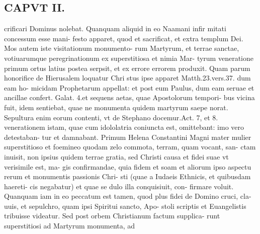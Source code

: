 \documentclass{article}
\begin{document}
\begin{pages}
\section*{CAPVT  II. }
\marginpar{[ p.69 ]}\pstart crificari Dominus nolebat. Quanquam aliquid in eo Naamani infir mitati concessum esse mani- festo apparet, quod et sacrificat, et extra templum Dei. Mos autem iste visitationum monumento- rum Martyrum, et terrae sanctae, votiuarumque peregrinationum ex superstitiosa et nimia Mar- tyrum veneratione primum ortus latius postea serpsit, et ex errore errorem produxit. Quam parum honorifice de Hierusalem loquatur Chri stus ipse apparet Matth.23.vers.37. dum eam ho- micidam Prophetarum appellat: et post eum Paulus, dum eam seruae et ancillae confert. Galat. 4.et sequens aetas, quae Apostolorum tempori- bus vicina fuit, idem sentiebat, quae ne monumenta quidem martyrum saepe norat. Sepultura enim eorum contenti, vt de Stephano docemur.Act. 7, et 8. venerationem istam, quae cum idololatria coniuncta est, omittebant: imo vero detestaban- tur et damnabant. Primum Helena Constantini Magni mater mulier superstitioso et foemineo quodam zelo commota, terram, quam vocant, san- ctam inuisit, non ipsius quidem terrae gratia, sed Christi causa et fidei suae vt verisimile est, ma- gis confirmandae, quia fidem et soam et aliorum ipso aspectu rerum et monumentis passionis Chri- sti (quae a Iudaeis Ethnicis, et quibusdam haereti- cis negabatur) et quae se dulo illa conquisiuit, con- firmare voluit. Quanquam iam in eo peccatum est tamen, quod plus fidei de Domino cruci, cla- uuis, et sepulchro, quam ipsi Spiritui sancto, Apo- stoli scriptis et Euangelistis tribuisse videatur. Sed post orbem Christianum factum supplica- runt superstitiosi ad Martyrum monumenta, ad  \pend

\end{pages}
\end{document}
